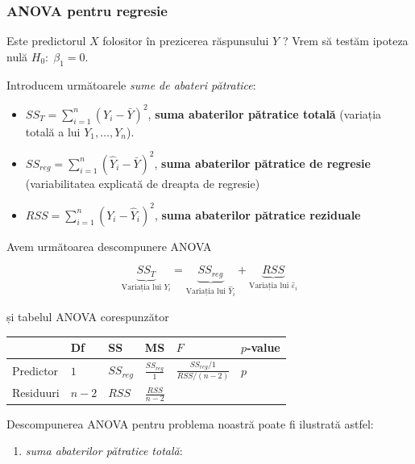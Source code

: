 \documentclass[]{article}
\providecommand{\tightlist}{%
  \setlength{\itemsep}{0pt}\setlength{\parskip}{0pt}}
\begin{document}
\subsubsection{ANOVA pentru regresie}\label{anova-pentru-regresie}

Este predictorul \(X\) folositor în prezicerea răspunsului \(Y\) ? Vrem
să testăm ipoteza nulă \(H_0:\;\beta_1=0\).

Introducem următoarele \emph{sume de abateri pătratice}:

\begin{itemize}
\tightlist
\item
  \(SS_T=\sum_{i=1}^n\left(Y_i-\bar Y\right)^2\), \textbf{suma
  abaterilor pătratice totală} (variația totală a lui
  \(Y_1,\ldots,Y_n\)).
\item
  \(SS_{reg}=\sum_{i=1}^n\left(\hat Y_i-\bar Y\right)^2\), \textbf{suma
  abaterilor pătratice de regresie} (variabilitatea explicată de dreapta
  de regresie)
\item
  \(RSS=\sum_{i=1}^n\left(Y_i-\hat Y_i\right)^2\), \textbf{suma
  abaterilor pătratice reziduale}
\end{itemize}

Avem următoarea descompunere ANOVA

\[
\underbrace{SS_T}_{\text{Variația lui }Y_i} = \underbrace{SS_{reg}}_{\text{Variația lui }\hat Y_i} + \underbrace{RSS}_{\text{Variația lui }\hat \varepsilon_i} 
\]

și tabelul ANOVA corespunzător

\begin{longtable}[]{@{}llllll@{}}
\toprule
& Df & SS & MS & \(F\) & \(p\)-value\tabularnewline
\midrule
\endhead
Predictor & \(1\) & \(SS_{reg}\) & \(\frac{SS_{reg}}{1}\) &
\(\frac{SS_{reg}/1}{RSS/(n-2)}\) & \(p\)\tabularnewline
Residuuri & \(n - 2\) & \(RSS\) & \(\frac{RSS}{n-2}\) & &\tabularnewline
\bottomrule
\end{longtable}

Descompunerea ANOVA pentru problema noastră poate fi ilustrată astfel:

\begin{enumerate}
\def\labelenumi{\alph{enumi})}
\tightlist
\item
  \emph{suma abaterilor pătratice totală}:
\end{enumerate}
\end{document}
